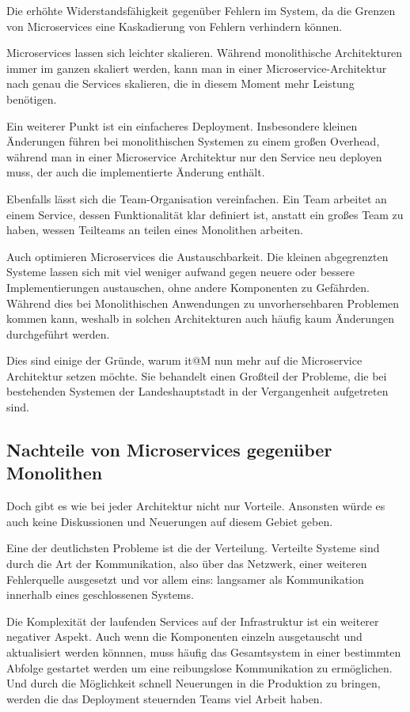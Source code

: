 \documentclass[12pt,a4paper,bibliography=totocnumbered,listof=totocnumbered]{scrartcl}
\begin{document}
Die erhöhte Widerstandsfähigkeit gegenüber Fehlern im System, da die Grenzen von Microservices eine Kaskadierung von Fehlern verhindern können.

Microservices lassen sich leichter skalieren. Während monolithische Architekturen immer im ganzen skaliert werden, kann man in einer Microservice-Architektur nach genau die Services skalieren, die in diesem Moment mehr Leistung benötigen.

Ein weiterer Punkt ist ein einfacheres Deployment. Insbesondere kleinen Änderungen führen bei monolithischen Systemen zu einem großen Overhead, während man in einer Microservice Architektur nur den Service neu deployen muss, der auch die implementierte Änderung enthält.

Ebenfalls lässt sich die Team-Organisation vereinfachen. Ein Team arbeitet an einem Service, dessen Funktionalität klar definiert ist, anstatt ein großes Team zu haben, wessen Teilteams an teilen eines Monolithen arbeiten.

Auch optimieren Microservices die Austauschbarkeit. Die kleinen abgegrenzten Systeme lassen sich mit viel weniger aufwand gegen neuere oder bessere Implementierungen austauschen, ohne andere Komponenten zu Gefährden. Während dies bei Monolithischen Anwendungen zu unvorhersehbaren Problemen kommen kann, weshalb in solchen Architekturen auch häufig kaum Änderungen durchgeführt werden.

Dies sind einige der Gründe, warum it@M nun mehr auf die Microservice Architektur setzen möchte. Sie behandelt einen Großteil der Probleme, die bei bestehenden Systemen der Landeshauptstadt in der Vergangenheit aufgetreten sind.

\subsection{Nachteile von Microservices gegenüber Monolithen}\label{ch:ms-mon-cons}

Doch gibt es wie bei jeder Architektur nicht nur Vorteile. Ansonsten würde es auch keine Diskussionen und Neuerungen auf diesem Gebiet geben.

Eine der deutlichsten Probleme ist die der Verteilung. Verteilte Systeme sind durch die Art der Kommunikation, also über das Netzwerk, einer weiteren Fehlerquelle ausgesetzt und vor allem eins: langsamer als Kommunikation innerhalb eines geschlossenen Systems\cite{tradeoffs}. 

Die Komplexität der laufenden Services auf der Infrastruktur ist ein weiterer negativer Aspekt. Auch wenn die Komponenten einzeln ausgetauscht und aktualisiert werden könnnen, muss häufig das Gesamtsystem in einer bestimmten Abfolge gestartet werden um eine reibungslose Kommunikation zu ermöglichen. Und durch die Möglichkeit schnell Neuerungen in die Produktion zu bringen, werden die das Deployment steuernden Teams viel Arbeit haben.\cite{tradeoffs}
\end{document}
